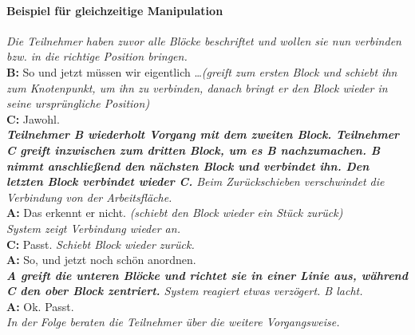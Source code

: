 \paragraph{Beispiel für gleichzeitige Manipulation} %
\begin{transkript}
	\emph{Die Teilnehmer haben zuvor alle Blöcke beschriftet und wollen sie nun verbinden bzw. in die richtige Position bringen.} \\
	\textbf{B:} So und jetzt müssen wir eigentlich \ldots \emph{(greift zum ersten Block und schiebt ihn zum Knotenpunkt, um ihn zu verbinden, danach bringt er den Block wieder in seine ursprüngliche Position)} \\
	\textbf{C:} Jawohl. \\
	\emph{\textbf{Teilnehmer B wiederholt Vorgang mit dem zweiten Block. Teilnehmer C greift inzwischen zum dritten Block, um es B nachzumachen. B nimmt anschließend den nächsten Block und verbindet ihn. Den letzten Block verbindet wieder C.} Beim Zurückschieben verschwindet die Verbindung von der Arbeitsfläche.} \\
	\textbf{A:} Das erkennt er nicht. \emph{(schiebt den Block wieder ein Stück zurück)} \\
	\emph{System zeigt Verbindung wieder an.} \\
	\textbf{C:} Passt. \emph{Schiebt Block wieder zurück.} \\
	\textbf{A:} So, und jetzt noch schön anordnen. \\
	\emph{\textbf{A greift die unteren Blöcke und richtet sie in einer Linie aus, während C den ober Block zentriert.} System reagiert etwas verzögert. B lacht.} \\
	\textbf{A:} Ok. Passt. \\
	\emph{In der Folge beraten die Teilnehmer über die weitere Vorgangsweise.} \\
\end{transkript}

